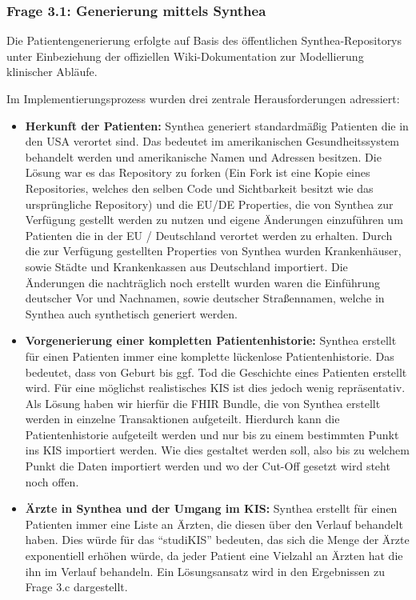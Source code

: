 \subsubsection{Frage 3.1: Generierung mittels Synthea}
\begin{description}[style=nextline, font=\bfseries]

    \item[Methodik] 
    Die Patientengenerierung erfolgte auf Basis des öffentlichen Synthea-Repositorys unter Einbeziehung der offiziellen Wiki-Dokumentation zur Modellierung klinischer Abläufe.

    \item[Hürden] 
    Im Implementierungsprozess wurden drei zentrale Herausforderungen adressiert: 
    \begin{itemize}[leftmargin=1.5em, labelsep=0.5em, itemsep=4pt, topsep=4pt]
        \item \textbf{Herkunft der Patienten:}
        Synthea generiert standardmäßig Patienten die in den USA verortet sind. Das bedeutet im amerikanischen Gesundheitssystem behandelt werden und amerikanische Namen und Adressen besitzen. Die Lösung war es das Repository zu forken (Ein Fork ist eine Kopie eines Repositories, welches den selben Code und Sichtbarkeit besitzt wie das ursprüngliche Repository) und die EU/DE Properties, die von Synthea zur Verfügung gestellt werden zu nutzen und eigene Änderungen einzuführen um Patienten die in der EU / Deutschland verortet werden zu erhalten.
        Durch die zur Verfügung gestellten Properties von Synthea wurden Krankenhäuser, sowie Städte und Krankenkassen aus Deutschland importiert. Die Änderungen die nachträglich noch erstellt wurden waren die Einführung deutscher Vor und Nachnamen, sowie deutscher Straßennamen, welche in Synthea auch synthetisch generiert werden.
        \item \textbf{Vorgenerierung einer kompletten Patientenhistorie:}
        Synthea erstellt für einen Patienten immer eine komplette lückenlose Patientenhistorie. Das bedeutet, dass von Geburt bis ggf. Tod die Geschichte eines Patienten erstellt wird. Für eine möglichst realistisches KIS ist dies jedoch wenig repräsentativ. Als Lösung haben wir hierfür die FHIR Bundle, die von Synthea erstellt werden in einzelne Transaktionen aufgeteilt. Hierdurch kann die Patientenhistorie aufgeteilt werden und nur bis zu einem bestimmten Punkt ins KIS importiert werden. Wie dies gestaltet werden soll, also bis zu welchem Punkt die Daten importiert werden und wo der Cut-Off gesetzt wird steht noch offen.
        \item \textbf{Ärzte in Synthea und der Umgang im KIS:}
        Synthea erstellt für einen Patienten immer eine Liste an Ärzten, die diesen über den Verlauf behandelt haben. Dies würde für das \enquote{studiKIS} bedeuten, das sich die Menge der Ärzte exponentiell erhöhen würde, da jeder Patient eine Vielzahl an Ärzten hat die ihn im Verlauf behandeln. Ein Lösungsansatz wird in den Ergebnissen zu Frage 3.c dargestellt.
    \end{itemize}


\end{description}
